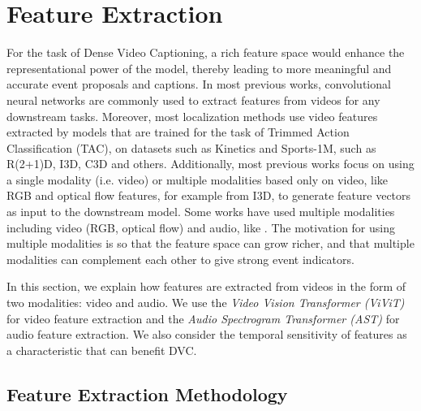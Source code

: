 \chapter{Feature Extraction}
\par For the task of Dense Video Captioning, a rich feature space would enhance the representational power of the model, thereby leading to more meaningful and accurate event proposals and captions. In most previous works, convolutional neural networks are commonly used to extract features  from videos for any downstream tasks. Moreover, most localization methods use video features extracted by models that are trained for the task of Trimmed Action Classification (TAC), on datasets such as Kinetics\cite{kay2017kinetics} and Sports-1M, such as R(2+1)D\cite{r(2+1)d}, I3D\cite{carreira2018quo}, C3D and others. Additionally, most previous works focus on using a single modality (i.e. video) or multiple modalities based only on video, like RGB and optical flow features, for example from I3D\cite{carreira2018quo}, to generate feature vectors as input to the downstream model. Some works have used multiple modalities including video (RGB, optical flow) and audio, like \cite{iashin2020better}. The motivation for using multiple modalities is so that the feature space can grow richer, and that multiple modalities can complement each other to give strong event indicators. 

\par In this section, we explain how features are extracted from videos in the form of two modalities: video and audio. We use the \textit{Video Vision Transformer (ViViT)} \cite{vivit} for video feature extraction and the \textit{Audio Spectrogram Transformer (AST)} \cite{ast} for audio feature extraction. We also consider the temporal sensitivity of features as a characteristic that can benefit DVC.

\section{Feature Extraction Methodology}


